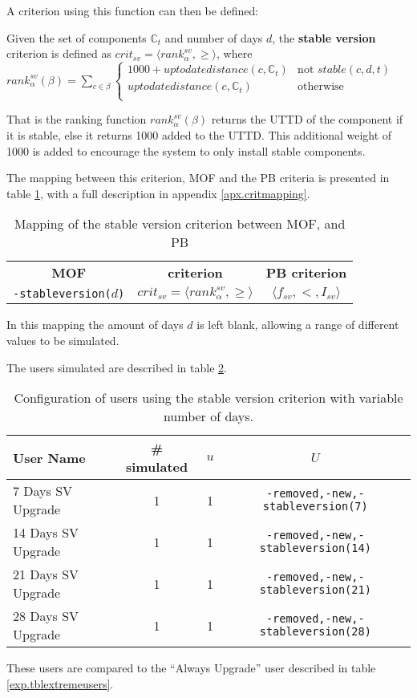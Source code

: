 A criterion using this function can then be defined:
\begin{defs}
	Given the set of components $\mathbb{C}_t$ and number of days $d$, the \textbf{stable version} criterion is defined as $crit_{sv} = \langle rank^{sv}_{\alpha}, \geq \rangle$,
	where \\$rank^{sv}_{\alpha}(\beta) = \sum_{c \in \beta} \begin{cases} 1000 + uptodatedistance(c,\mathbb{C}_t)& \text{not }stable(c,d,t) \\ uptodatedistance(c,\mathbb{C}_t) & \text{otherwise} \\  \end{cases}$
\end{defs}
That is the ranking function $rank^{sv}_{\alpha}(\beta)$ returns the UTTD of the component if it is stable,
else it returns 1000 added to the UTTD.
This additional weight of 1000 is added to encourage the system to only install stable components.

The mapping between this criterion, MOF and the PB criteria is presented in table \ref{exp.stablcritmapping}, with a full description in appendix \ref{apx.critmapping}.
\begin{table}[htp]
\begin{tabular}{c | c | c}
\textbf{MOF} 		& \textbf{\modelname criterion} & \textbf{PB criterion} \\
\texttt{-stableversion(}$d$\texttt{)} & $crit_{sv} = \langle rank^{sv}_{\alpha}, \geq \rangle$ & $\langle f_{sv}, <, I_{sv} \rangle$ \\
\end{tabular}
\caption{Mapping of the stable version criterion between MOF, \modelname and PB}
\label{exp.stablcritmapping}
\end{table}
In this mapping the amount of days $d$ is left blank, allowing a range of different values to be simulated.

The users simulated are described in table \ref{exp.tblsvusers}.
\begin{table}[h!]
\centering
\begin{tabular}{|l | c | c | c | }
\hline
User Name 				& \# simulated 	& $u$ 	& $U$ 			\\ \hline
7 Days SV Upgrade		& 1 			& 1 & 	\texttt{-removed,-new,-stableversion(7)}			 \\
14 Days SV Upgrade		& 1 			& 1 & 	\texttt{-removed,-new,-stableversion(14)}			\\
21 Days SV Upgrade		& 1 			& 1 & 	\texttt{-removed,-new,-stableversion(21)}			 \\
28 Days SV Upgrade 		& 1 			& 1 & 	\texttt{-removed,-new,-stableversion(28)}			\\ \hline
\end{tabular}
\caption{Configuration of users using the stable version criterion with variable number of days.}
\label{exp.tblsvusers}
\end{table}
These users are compared to the ``Always Upgrade'' user described in table \ref{exp.tblextremeusers}.

